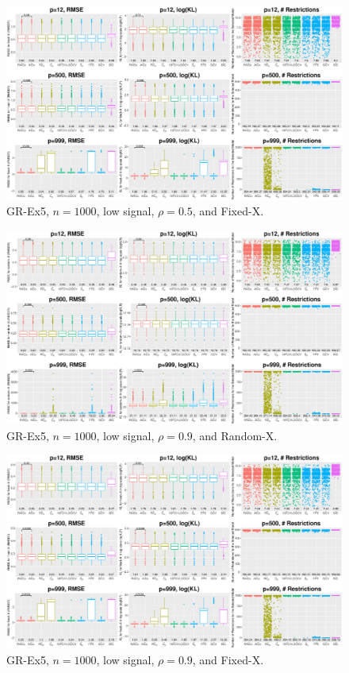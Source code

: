 \begin{figure}[!ht]
\centering
\includegraphics[width=\textwidth]{figures/supplement/fixedx_GR-Ex5_n1000_lsnr_rho05.eps}
\caption{GR-Ex5, $n=1000$, low signal, $\rho=0.5$, and Fixed-X.}
\end{figure}
\clearpage
\begin{figure}[!ht]
\centering
\includegraphics[width=\textwidth]{figures/supplement/randomx_GR-Ex5_n1000_lsnr_rho09.eps}
\caption{GR-Ex5, $n=1000$, low signal, $\rho=0.9$, and Random-X.}
\end{figure}
\begin{figure}[!ht]
\centering
\includegraphics[width=\textwidth]{figures/supplement/fixedx_GR-Ex5_n1000_lsnr_rho09.eps}
\caption{GR-Ex5, $n=1000$, low signal, $\rho=0.9$, and Fixed-X.}
\end{figure}
